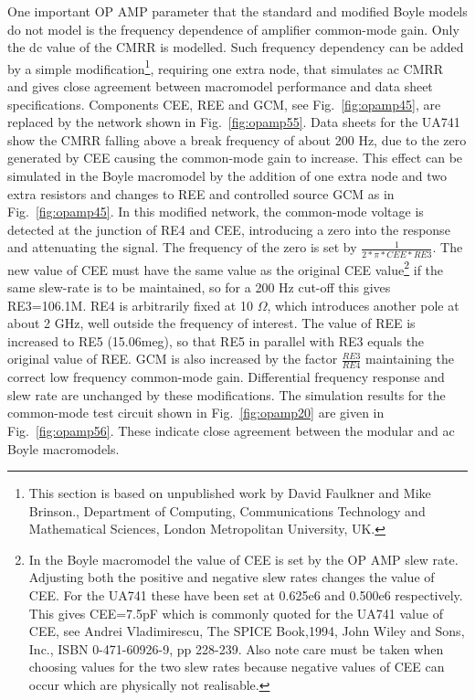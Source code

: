 One important OP AMP parameter that the standard and modified Boyle models do not model is the frequency dependence of amplifier common-mode gain. Only the dc value of the CMRR is modelled. Such frequency dependency can be added by a simple modification\footnote{This section is based on unpublished work by David Faulkner and Mike Brinson., Department of Computing, Communications Technology and Mathematical Sciences, London Metropolitan University, UK.}, requiring one extra node, that simulates ac CMRR and gives close agreement between macromodel performance and data sheet specifications.  Components CEE, REE and GCM, see Fig.~\ref{fig:opamp45}, are replaced by the network shown in Fig.~\ref{fig:opamp55}.  Data sheets for the UA741 show the CMRR falling above a break frequency of about 200 Hz, due to the zero generated by CEE causing the common-mode gain to increase.  This effect can be simulated in the Boyle macromodel by the addition of one extra node and two extra resistors and changes to REE and controlled source GCM as in Fig.~\ref{fig:opamp45}. In this modified network, the common-mode voltage is detected at the junction of RE4 and CEE, introducing a zero into the response and attenuating the signal. The frequency of the zero is set by $\frac{1}{2*\pi*CEE*RE3}$. The new value of CEE must have the same value as the original CEE value\footnote{In the Boyle macromodel the value of CEE is set by the OP AMP slew rate. Adjusting both the positive and negative slew rates changes the value of CEE. For the UA741 these have been set at 0.625e6 and 0.500e6 respectively. This gives CEE=7.5pF which is commonly quoted for the UA741 value of CEE, see Andrei Vladimirescu, The SPICE Book,1994, John Wiley and Sons, Inc., ISBN 0-471-60926-9, pp 228-239. Also note care must be taken when choosing values for the two slew rates because negative values of CEE can occur which are physically not realisable.} if the same slew-rate is to be maintained, so for a 200 Hz cut-off this gives RE3=106.1M. RE4 is arbitrarily fixed at 10 $\Omega$, which introduces another pole at about 2 GHz, well outside the frequency of interest.  The value of REE is increased to RE5 (15.06meg), so that RE5 in parallel with RE3 equals the original value of REE.  GCM is also increased by the factor $\frac{RE3}{RE4}$ maintaining the correct low frequency common-mode gain. Differential frequency response and slew rate are unchanged by these modifications. The simulation results for the common-mode test circuit shown in Fig.~\ref{fig:opamp20} are given in Fig.~\ref{fig:opamp56}. These indicate close agreement between the modular and ac Boyle macromodels.


